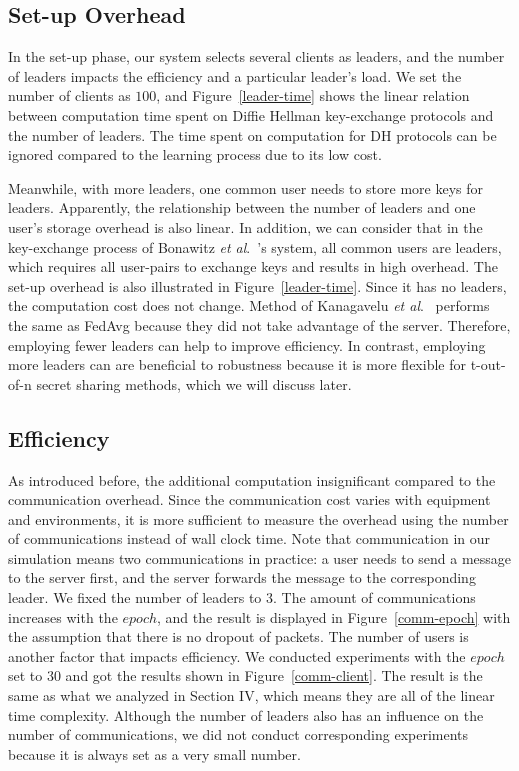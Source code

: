 \subsection{Set-up Overhead}
In the set-up phase, our system selects several clients as leaders, and the number of leaders impacts the efficiency and a particular leader's load. We set the number of clients as $100$, and Figure~\ref{leader-time} shows the linear relation between computation time spent on Diffie Hellman key-exchange protocols and the number of leaders. The time spent on computation for DH protocols can be ignored compared to the learning process due to its low cost.

Meanwhile, with more leaders, one common user needs to store more keys for leaders. Apparently, the relationship between the number of leaders and one user's storage overhead is also linear. In addition, we can consider that in the key-exchange process of Bonawitz \emph{et al}.~\cite{Practical}'s system, all common users are leaders, which requires all user-pairs to exchange keys and results in high overhead. The set-up overhead is also illustrated in Figure~\ref{leader-time}. Since it has no leaders, the computation cost does not change. Method of Kanagavelu \emph{et al}.~\cite{Two-Phase} performs the same as FedAvg because they did not take advantage of the server. Therefore, employing fewer leaders can help to improve efficiency. In contrast, employing more leaders can are beneficial to robustness because it is more flexible for t-out-of-n secret sharing methods, which we will discuss later. 


\subsection{Efficiency}
As introduced before, the additional computation insignificant compared to the communication overhead. Since the communication cost varies with equipment and environments, it is more sufficient to measure the overhead using the number of communications instead of wall clock time. Note that communication in our simulation means two communications in practice: a user needs to send a message to the server first, and the server forwards the message to the corresponding leader. We fixed the number of leaders to 3. The amount of communications increases with the $epoch$, and the result is displayed in Figure~\ref{comm-epoch} with the assumption that there is no dropout of packets. The number of users is another factor that impacts efficiency. We conducted experiments with the $epoch$ set to 30 and got the results shown in Figure~\ref{comm-client}. The result is the same as what we analyzed in Section IV, which means they are all of the linear time complexity. Although the number of leaders also has an influence on the number of communications, we did not conduct corresponding experiments because it is always set as a very small number. 


